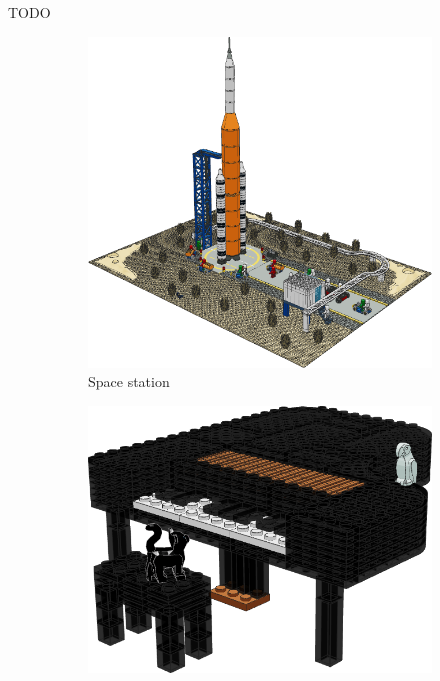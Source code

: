 \documentclass{PDS}
\begin{document}
TODO

\begin{figure}[htbp]
    \centering
    \begin{subfigure}[b]{0.3\textwidth}
        \centering
        \includegraphics[width=\textwidth]{./figures/space.png}
        \caption{Space station}
        \label{fig:rocket}
    \end{subfigure}
    \hfill
    \begin{subfigure}[b]{0.3\textwidth}
        \centering
        \includegraphics[width=\textwidth]{./figures/piano.png}

\end{subfigure}
\end{figure}
\end{document}
